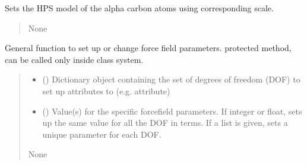 \documentclass[letterpaper,10pt,english]{sphinxmanual}
\begin{document}
\begin{fulllineitems}
\begin{fulllineitems}
\sphinxAtStartPar
Sets the HPS model of the alpha carbon atoms using corresponding scale.
\begin{quote}\begin{description}
\sphinxAtStartPar
None

\end{description}\end{quote}

\end{fulllineitems}


\begin{fulllineitems}
\label{\detokenize{modules/system:hps.core.system._setParameters}}
\pysigstartsignatures
{}
\pysigstopsignatures
\sphinxAtStartPar
General function to set up or change force field parameters.
protected method, can be called only inside class system.
\begin{quote}\begin{description}
\begin{itemize}
\item {} 
\sphinxAtStartPar
{} () \textendash{} Dictionary object containing the set of degrees of freedom
(DOF) to set up attributes to (e.g.  attribute)

\item {} 
\sphinxAtStartPar
{} () \textendash{} Value(s) for the specific forcefield parameters. If integer
or float, sets up the same value for all the DOF in terms.
If a list is given, sets a unique parameter for each DOF.

\end{itemize}

\sphinxAtStartPar
None

\end{description}\end{quote}

\end{fulllineitems}


\end{fulllineitems}
\end{document}

